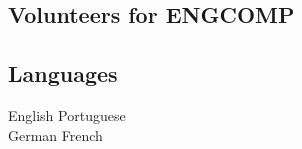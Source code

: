 \documentclass[a4paper]{deedy-resume} %
\begin{document}
\begin{minipage}[t]{0.33\textwidth}
\subsection{Volunteers for ENGCOMP}


\sectionspace %



\subsection{Languages}

English \textbullet{}  Portuguese  \\ 
German \textbullet{} French \\


\sectionspace %

\end{minipage} %
\hfill
%
%
\end{document}
